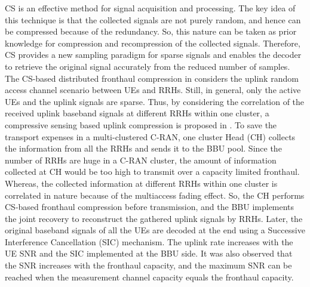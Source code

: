 \begin{multicols}{2}
\begin{itemize}
CS is an effective method for signal acquisition and processing. The key idea of this technique is that the collected signals are not purely random, and hence can be compressed because of the redundancy. So, this nature can be taken as prior knowledge for compression and recompression of the collected signals. Therefore, CS provides a new sampling paradigm for sparse signals and enables the decoder to retrieve the original signal accurately from the reduced number of samples. The CS-based distributed fronthaul compression in \cite{art3-key54} considers the uplink random access channel scenario between UEs and RRHs. Still, in general, only the active UEs and the uplink signals are sparse. Thus, by considering the correlation of the received uplink baseband signals at different RRHs within one cluster, a compressive sensing based uplink compression is proposed in \cite{art3-key55}. To save the transport expenses in a multi-clustered C-RAN, one cluster Head (CH) collects the information from all the RRHs and sends it to the BBU pool. Since the number of RRHs are huge in a C-RAN cluster, the amount of information collected at CH would be too high to transmit over a capacity limited fronthaul. Whereas, the collected information at different RRHs within one cluster is correlated in nature because of the multiaccess fading effect. So, the CH performs CS-based fronthaul compression before transmission, and the BBU implements the joint recovery to reconstruct the gathered uplink signals by RRHs. Later, the original baseband signals of all the UEs are decoded at the end using a Successive Interference Cancellation (SIC) mechanism. The uplink rate increases with the UE SNR and the SIC implemented at the BBU side. It was also observed that the SNR increases with the fronthaul capacity, and the maximum SNR can be reached when the measurement channel capacity equals the fronthaul capacity. 


\end{itemize}
\end{multicols}
